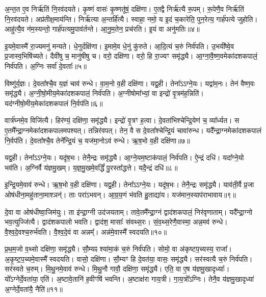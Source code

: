 अ॒न्त॒त ए॒व निर्\mbox{}ऋ॑तिं नि॒रव॑दयते।
कृ॒ष्णं वासः॑ कृ॒ष्णतू॑षं॒ दक्षि॑णा।
ए॒तद्वै निर्\mbox{}ऋ॑त्यै रू॒पम्।
रू॒पेणै॒व निर्\mbox{}ऋ॑तिं नि॒रव॑दयते।
अप्र॑तीक्ष॒माय॑न्ति।
निर्\mbox{}ऋ॑त्या अ॒न्तर्\mbox{}हि॑त्यै।
स्वाहा॒ नमो॒ य इ॒दं च॒कारेति॒ पुन॒रेत्य॒ गार्\mbox{}ह॑पत्ये जुहोति।
आहु॑त्यै॒व न॑म॒स्यन्तो॒ गार्\mbox{}ह॑पत्यमु॒पाव॑र्तन्ते।
आ॒नु॒म॒तेन॒ प्रच॑रति।
इ॒यं वा अनु॑मतिः॥४॥\ip

इ॒यमे॒वास्मै॑ रा॒ज्यमनु॑ मन्यते।
धे॒नुर्दक्षि॑णा।
इ॒मामे॒व धे॒नुं कु॑रुते।
आ॒दि॒त्यं च॒रुं निर्व॑पति।
उ॒भयी᳚ष्वे॒व प्र॒जास्व॒भिषि॑च्यते।
दैवी॑षु च॒ मानु॑षीषु च।
वरो॒ दक्षि॑णा।
वरो॒ हि रा॒ज्यꣳ समृ॑द्ध्यै।
आ॒ग्ना॒वै॒ष्ण॒वमेका॑\-दश\-कपालं॒ निर्व॑पति।
अ॒ग्निः सर्वा॑ दे॒वताः᳚॥५॥\ip

विष्णु॑र्य॒ज्ञः।
दे॒वता᳚श्चै॒व य॒ज्ञं चाव॑ रुन्धे।
वा॒म॒नो व॒ही दक्षि॑णा।
यद्व॒ही।
तेना᳚ऽऽग्ने॒यः।
यद्वा॑म॒नः।
तेन॑ वैष्ण॒वः समृ॑द्ध्यै।
अ॒ग्नी॒षो॒मीय॒मेका॑\-दश\-कपालं॒ निर्व॑पति।
अ॒ग्नीषोमा᳚भ्यां॒ वा इन्द्रो॑ वृ॒त्रम॑ह॒न्निति॑।
यद॑ग्नीषो॒मीय॒मेका॑\-दश\-कपालं नि॒र्वप॑ति॥६॥\ip

वार्त्र॑घ्नमे॒व विजि॑त्यै।
हिर॑ण्यं॒ दक्षि॑णा॒ समृ॑द्ध्यै।
इन्द्रो॑ वृ॒त्रꣳ ह॒त्वा।
दे॒वता॑भिश्चेन्द्रि॒येण॑ च॒ व्या᳚र्ध्यत।
स ए॒तमै᳚न्द्रा॒ग्नमेका॑\-दश\-कपालमपश्यत्।
तन्निर॑वपत्।
तेन॒ वै स दे॒वता᳚श्चेन्द्रि॒यं चावा॑रुन्ध।
यदै᳚न्द्रा॒ग्नमेका॑\-दश\-कपालं नि॒र्वप॑ति।
दे॒वता᳚श्चै॒व तेने᳚न्द्रि॒यं च॒ यज॑मा॒नो\-ऽव॑ रुन्धे।
ऋ॒ष॒भो व॒ही दक्षि॑णा॥७॥\ip

यद्व॒ही।
तेना᳚ऽऽग्ने॒यः।
यदृ॑ष॒भः।
तेनै॒न्द्रः समृ॑द्ध्यै।
आ॒ग्ने॒यम॒ष्टा\-क॑पालं॒ निर्व॑पति।
ऐ॒न्द्रं दधि॑।
यदा᳚ग्ने॒यो भव॑ति।
अ॒ग्निर्वै य॑ज्ञमु॒खम्।
य॒ज्ञ॒\-मु॒खमे॒वर्द्धिं॑ पु॒रस्ता᳚द्धत्ते।
यदै॒न्द्रं दधि॑॥८॥\ip

इ॒न्द्रि॒यमे॒वाव॑ रुन्धे।
ऋ॒ष॒भो व॒ही दक्षि॑णा।
यद्व॒ही।
तेना᳚ऽऽग्ने॒यः।
यदृ॑ष॒भः।
तेनै॒न्द्रः समृ॑द्ध्यै।
याव॑ती॒र्वै प्र॒जा ओष॑धीना॒महु॑ताना॒माश्ञन्॑।
ताः परा॑\-ऽभवन्।
आ॒ग्र॒य॒णं भ॑वति हु॒ताद्या॑य।
यज॑मान॒स्याप॑रा\-भावाय॥९॥\ip

दे॒वा वा ओष॑धीष्वा॒जिम॑युः।
ता इ॑न्द्रा॒ग्नी उद॑जयताम्।
तावे॒तमै᳚न्द्रा॒ग्नं द्वाद॑शकपालं॒ निर॑वृणाताम्।
यदै᳚न्द्रा॒ग्नो भव॒त्युज्जि॑त्यै।
द्वाद॑शकपालो भवति।
द्वाद॑श॒ मासाः᳚ संवथ्स॒रः।
सं॒व॒थ्स॒रेणै॒वास्मा॒ अन्न॒मव॑ रुन्धे।
वै॒श्व॒दे॒व\-श्च॒रुर्भ॑वति।
वै॒श्व॒दे॒वं वा अन्नम्᳚।
अन्न॑मे॒वास्मै᳚ स्वदयति॥१०॥\ip

प्र॒थ॒म॒जो व॒थ्सो दक्षि॑णा॒ समृ॑द्ध्यै।
सौ॒म्यꣴ श्या॑मा॒कं च॒रुं निर्व॑पति।
सोमो॒ वा अ॑कृष्टप॒च्यस्य॒ राजा᳚।
अ॒कृ॒ष्ट॒प॒च्यमे॒वास्मै᳚ स्वदयति।
वासो॒ दक्षि॑णा।
सौ॒म्यꣳ हि दे॒वत॑या॒ वासः॒ समृ॑द्ध्यै।
सर॑स्वत्यै च॒रुं निर्व॑पति।
सर॑स्वते च॒रुम्।
मि॒थु॒नमे॒वाव॑ रुन्धे।
मि॒थु॒नौ गावौ॒ दक्षि॑णा॒ समृ॑द्ध्यै।
एति॒ वा ए॒ष य॑ज्ञमु॒खादृध्याः᳚।
यो᳚ऽग्नेर्दे॒वता॑या॒ एति॑।
अ॒ष्टावे॒तानि॑ ह॒वीꣳषि॑ भवन्ति।
अ॒ष्टाक्ष॑रा गाय॒त्री।
गा॒य॒त्रो᳚\-ऽग्निः।
तेनै॒व य॑ज्ञमु॒खादृध्या॑ अ॒ग्नेर्दे॒वता॑यै॒ नैति॑॥११॥\ip{}

